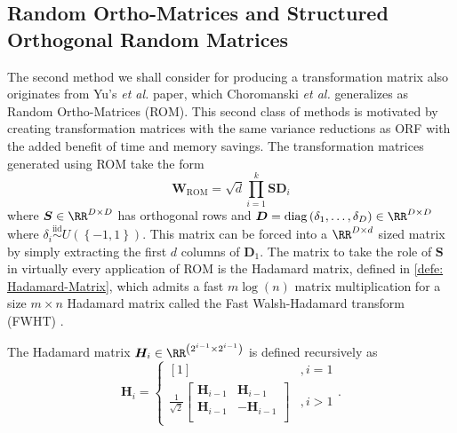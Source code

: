 \subsection{Random Ortho-Matrices and Structured Orthogonal Random Matrices}\label{Section3.3}

The second method we shall consider for producing a transformation matrix also originates from Yu's {\it et al.} paper, which Choromanski {\it et al.} \cite{ChoromanskiKrzysztof2017TUEo} generalizes as Random Ortho-Matrices (ROM). This second class of methods is motivated by creating transformation matrices with the same variance reductions as ORF with the added benefit of time and memory savings. The transformation matrices generated using ROM take the form
\begin{equation} \label{eq: ROM-general}
    \bm{W}_{\text{ROM}} = \sqrt{d} \prod_{i=1}^{k} \bm{S} \bm{D}_{i}
\end{equation}
where $\bm{S} \in \RR^{D \times D}$ has orthogonal rows and $\bm{D} = \operatorname{diag} \left( \delta_1 , \ldots , \delta_D \right) \in \RR^{D \times D}$ where $\delta_i \stackrel{\text{iid}}{\sim} U \left( \left\{ -1, 1 \right\} \right)$. This matrix can be forced into a $\RR^{D \times d}$ sized matrix by simply extracting the first $d$ columns of $\bm{D}_1$. The matrix to take the role of $\bm{S}$ in virtually every application of ROM is the Hadamard matrix, defined in \ref{defe: Hadamard-Matrix}, which admits a fast $m \log (n)$ matrix multiplication for a size $m \times n$ Hadamard matrix called the Fast Walsh-Hadamard transform (FWHT) \cite{Fino1976UMTo}.

\begin{defe} \label{defe: Hadamard-Matrix}
    The Hadamard matrix $\bm{H}_i \in \RR^{\left( 2^{i-1} \times 2^{i-1} \right)}$ is defined recursively as
    \[
        \bm{H}_i =
        \left\{
        \begin{array}{cc}
            \left[ 1 \right] & , i=1 \\
            \frac{1}{\sqrt{2}}
            \begin{bmatrix}
                \bm{H}_{i-1} & \bm{H}_{i-1}   \\
                \bm{H}_{i-1} & - \bm{H}_{i-1} \\
            \end{bmatrix}
                             & , i>1
        \end{array}
        \right. .
    \]
\end{defe}


